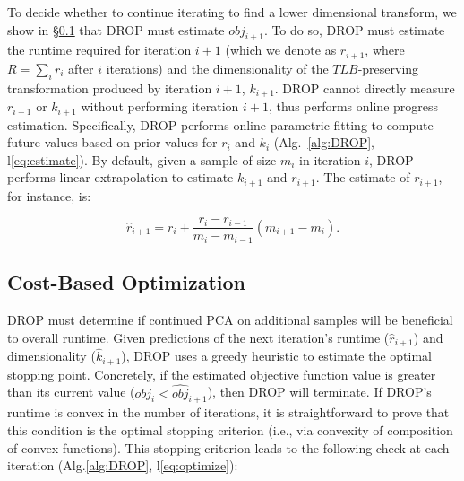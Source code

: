 To decide whether to continue iterating to find a lower dimensional transform, we show in  \S\ref{subsec:opt} that DROP must estimate $obj_{i+1}$. To do so, DROP must estimate the runtime required for iteration $i+1$ (which we denote as $r_{i+1}$, where $R=\sum_i r_i$ after $i$ iterations) and the dimensionality of the $TLB$-preserving transformation produced by iteration $i+1$, $k_{i+1}$. 
DROP cannot directly measure $r_{i+1}$ or $k_{i+1}$ without performing iteration $i+1$, thus performs online progress estimation. Specifically, DROP performs online parametric fitting to compute future values based on prior values for $r_{i}$ and $k_i$ (Alg.~\ref{alg:DROP}, l\ref{eq:estimate}). 
By default, given a sample of size $m_i$ in iteration $i$, DROP performs linear extrapolation to estimate $k_{i+1}$ and $r_{i+1}$. The estimate of $r_{i+1}$, for instance, is:

\vspace{-.4cm}
\begin{equation*}
\hat{r}_{i+1} = r_i + \frac{r_i - r_{i-1}}{m_i - m_{i-1}} (m_{i+1} -  m_i).
\end{equation*}

\subsection{Cost-Based Optimization}
\label{subsec:opt}

DROP must determine if continued PCA on additional samples will be beneficial to overall runtime. 
Given predictions of the next iteration's runtime ($\hat{r}_{i+1}$) and dimensionality ($\hat{k}_{i+1}$), DROP uses a greedy heuristic to estimate the optimal stopping point.
Concretely, if the estimated objective function value is greater than its current value ($obj_i < \widehat{obj}_{i+1}$), then DROP will terminate. 
If DROP's runtime is convex in the number of iterations, it is straightforward to prove that this condition is the optimal stopping criterion (i.e., via convexity of composition of convex functions). 
This stopping criterion leads to the following check at each iteration (Alg.\ref{alg:DROP}, l\ref{eq:optimize}): 

